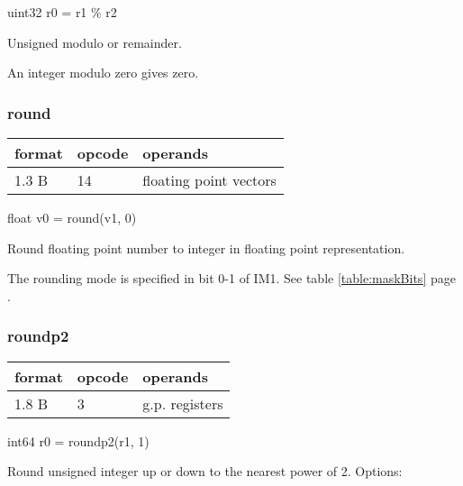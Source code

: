 \documentclass[forwardcom.tex]{subfiles}
\begin{document}
uint32 r0 = r1 \% r2
\vspace{2mm}

Unsigned modulo or remainder.

\vspace{2mm}
An integer modulo zero gives zero.


\subsubsection{round}
\label{table:roundInstruction}
\begin{tabular}{|p{12mm}|p{12mm}|p{110mm}|}
\hline
\bfseries format & \bfseries opcode & \bfseries operands \\ \hline
1.3 B & 14 & floating point vectors \\ \hline
\end{tabular}
\vspace{2mm}

float v0 = round(v1, 0)
\vspace{2mm}

Round floating point number to integer in floating point representation.
\vspace{2mm}

The rounding mode is specified in bit 0-1 of IM1. See table \ref{table:maskBits} page \pageref{table:maskBits}.


\subsubsection{roundp2}
\label{table:roundP2Instruction}
\begin{tabular}{|p{12mm}|p{12mm}|p{110mm}|}
\hline
\bfseries format & \bfseries opcode & \bfseries operands \\ \hline
1.8 B &  3 & g.p. registers \\ \hline
\end{tabular}
\vspace{2mm}

int64 r0 = roundp2(r1, 1)
\vspace{2mm}

Round unsigned integer up or down to the nearest power of 2. Options:
\vspace{2mm}
\end{document}
